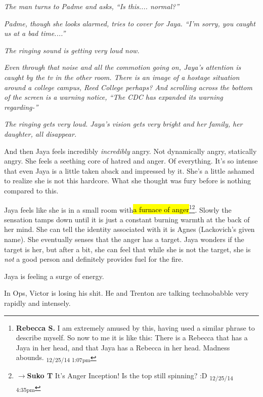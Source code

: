 \textit{The man turns to Padme and asks, ``Is this.... normal?''}

\textit{Padme, though she looks alarmed, tries to cover for Jaya.  ``I'm sorry, you caught us at a bad time....''}

\textit{The ringing sound is getting very loud now.}

\textit{Even through that noise and all the commotion going on, Jaya's attention is caught by the tv in the other room.  There is an image of a hostage situation around a college campus, Reed College perhaps?  And scrolling across the bottom of the screen is a warning notice, ``The CDC has expanded its warning regarding-''}

\textit{The ringing gets very loud.  Jaya's vision gets very bright and her family, her daughter, all disappear.}





And then Jaya feels incredibly \textit{incredibly} angry.  Not dynamically angry, statically angry.  She feels a seething core of hatred and anger.  Of everything.  It's so intense that even Jaya is a little taken aback and impressed by it.  She's a little ashamed to realize she is not this hardcore.  What she thought was fury before is nothing compared to this.



Jaya feels like she is in a small room with\hl{a furnace of anger}\footnote{\textbf{Rebecca S. }I am extremely amused by this, having used a similar phrase to describe myself.  So now to me it is like this:  There is a Rebecca that has a Jaya in her head, and that Jaya has a Rebecca in her head.  Madness abounds. \textsubscript{12/25/14 1:07pm}}\footnote{$\rightarrow$\textbf{Suko T }It's Anger Inception!  Is the top still spinning? :D \textsubscript{12/25/14 4:35pm}}.  Slowly the sensation tamps down until it is just a constant burning warmth at the back of her mind.  She can tell the identity associated with it is Agnes (Lackovich's given name).  She eventually senses that the anger has a target.  Jaya wonders if the target is her, but after a bit, she can feel that while she is not the target, she is \textit{not} a good person and definitely provides fuel for the fire.  



Jaya is feeling a surge of energy.





In Ops, Victor is losing his shit.  He and Trenton are talking technobabble very rapidly and intensely.

